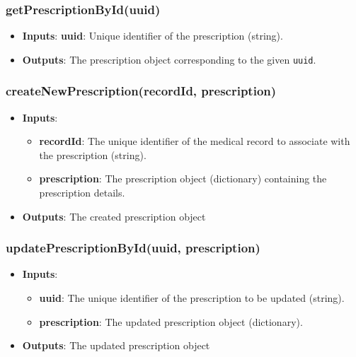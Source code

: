 \documentclass[12pt, titlepage]{article}
\begin{document}
\subsubsection{getPrescriptionById(uuid)}
\begin{itemize}
    \item \textbf{Inputs}: \textbf{uuid}: Unique identifier of the prescription (string).
    \item \textbf{Outputs}: The prescription object corresponding to the given \texttt{uuid}.
\end{itemize}

\subsubsection{createNewPrescription(recordId, prescription)}
\begin{itemize}
    \item \textbf{Inputs}:
        \begin{itemize}
            \item \textbf{recordId}: The unique identifier of the medical record to associate with the prescription (string).
            \item \textbf{prescription}: The prescription object (dictionary) containing the prescription details.
        \end{itemize}
    \item \textbf{Outputs}: The created prescription object
\end{itemize}

\subsubsection{updatePrescriptionById(uuid, prescription)}
\begin{itemize}
    \item \textbf{Inputs}:
        \begin{itemize}
            \item \textbf{uuid}: The unique identifier of the prescription to be updated (string).
            \item \textbf{prescription}: The updated prescription object (dictionary).
        \end{itemize}
    \item \textbf{Outputs}: The updated prescription object
\end{itemize}
\end{document}
